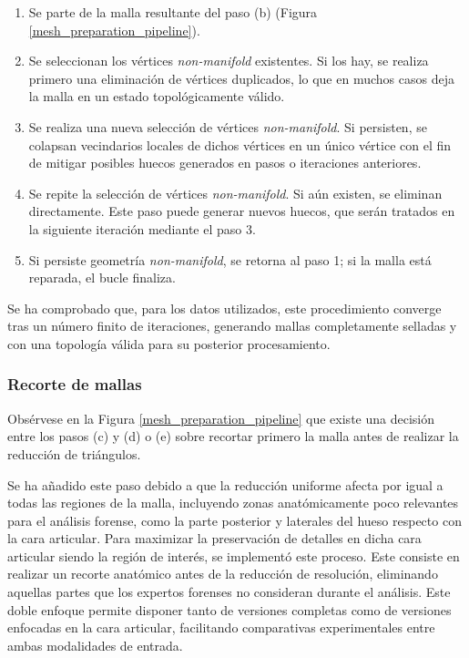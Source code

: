 \begin{enumerate}
    \item Se parte de la malla resultante del paso (b) (Figura \ref{mesh_preparation_pipeline}).
    \item Se seleccionan los vértices \textit{non-manifold} existentes. Si los hay, se realiza primero una eliminación de vértices duplicados, lo que en muchos casos deja la malla en un estado topológicamente válido.
    \item Se realiza una nueva selección de vértices \textit{non-manifold}. Si persisten, se colapsan vecindarios locales de dichos vértices en un único vértice con el fin de mitigar posibles huecos generados en pasos o iteraciones anteriores.
    \item Se repite la selección de vértices \textit{non-manifold}. Si aún existen, se eliminan directamente. Este paso puede generar nuevos huecos, que serán tratados en la siguiente iteración mediante el paso 3.
    \item Si persiste geometría \textit{non-manifold}, se retorna al paso 1; si la malla está reparada, el bucle finaliza.
\end{enumerate}

Se ha comprobado que, para los datos utilizados, este procedimiento converge tras un número finito de iteraciones, generando mallas completamente selladas y con una topología válida para su posterior procesamiento.

\subsubsection{Recorte de mallas}
Obsérvese en la Figura \ref{mesh_preparation_pipeline} que existe una decisión entre los pasos (c) y (d) o (e) sobre recortar primero la malla antes de realizar la reducción de triángulos.

Se ha añadido este paso debido a que la reducción uniforme afecta por igual a todas las regiones de la malla, incluyendo zonas anatómicamente poco relevantes para el análisis forense, como la parte posterior y laterales del hueso respecto con la cara articular. Para maximizar la preservación de detalles en dicha cara articular siendo la región de interés, se implementó este proceso. Este consiste en realizar un recorte anatómico antes de la reducción de resolución, eliminando aquellas partes que los expertos forenses no consideran durante el análisis. Este doble enfoque permite disponer tanto de versiones completas como de versiones enfocadas en la cara articular, facilitando comparativas experimentales entre ambas modalidades de entrada.

